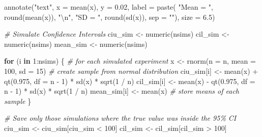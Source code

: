 \documentclass[
  oneside]{krantz}
\makeatletter
\newenvironment{Shaded}{\begin{snugshade}}{\end{snugshade}}
\newcommand{\AttributeTok}[1]{\textcolor[rgb]{0.61,0.61,0.61}{#1}}
\newcommand{\CommentTok}[1]{\textcolor[rgb]{0.37,0.37,0.37}{\textit{#1}}}
\newcommand{\ControlFlowTok}[1]{\textcolor[rgb]{0.27,0.27,0.27}{\textbf{#1}}}
\newcommand{\DecValTok}[1]{\textcolor[rgb]{0.06,0.06,0.06}{#1}}
\newcommand{\FloatTok}[1]{\textcolor[rgb]{0.06,0.06,0.06}{#1}}
\newcommand{\FunctionTok}[1]{\textcolor[rgb]{0,0,0}{#1}}
\newcommand{\NormalTok}[1]{#1}
\newcommand{\OtherTok}[1]{\textcolor[rgb]{0.37,0.37,0.37}{#1}}
\newcommand{\SpecialCharTok}[1]{\textcolor[rgb]{0,0,0}{#1}}
\newcommand{\StringTok}[1]{\textcolor[rgb]{0.5,0.5,0.5}{#1}}
\newenvironment{kframe}{%
\medskip{}
\setlength{\fboxsep}{.8em}
 \def\at@end@of@kframe{}%
 \ifinner\ifhmode%
  \def\at@end@of@kframe{\end{minipage}}%
  \begin{minipage}{\columnwidth}%
 \fi\fi%
 \def\FrameCommand##1{\hskip\@totalleftmargin \hskip-\fboxsep
 \colorbox{shadecolor}{##1}\hskip-\fboxsep
     \hskip-\linewidth \hskip-\@totalleftmargin \hskip\columnwidth}%
 \MakeFramed {\advance\hsize-\width
   \@totalleftmargin\z@ \linewidth\hsize
   \@setminipage}}%
 {\par\unskip\endMakeFramed%
 \at@end@of@kframe}
\renewenvironment{Shaded}{\begin{kframe}}{\end{kframe}}
\makeatother
\begin{document}
\begin{Shaded}
\begin{Highlighting}[]
  \FunctionTok{annotate}\NormalTok{(}\StringTok{"text"}\NormalTok{, }\AttributeTok{x =} \FunctionTok{mean}\NormalTok{(x), }\AttributeTok{y =} \FloatTok{0.02}\NormalTok{, }\AttributeTok{label =} \FunctionTok{paste}\NormalTok{(}
    \StringTok{"Mean = "}\NormalTok{, }\FunctionTok{round}\NormalTok{(}\FunctionTok{mean}\NormalTok{(x)), }\StringTok{"}\SpecialCharTok{\textbackslash{}n}\StringTok{"}\NormalTok{,}
    \StringTok{"SD = "}\NormalTok{, }\FunctionTok{round}\NormalTok{(}\FunctionTok{sd}\NormalTok{(x)), }\AttributeTok{sep =} \StringTok{""}\NormalTok{), }\AttributeTok{size =} \FloatTok{6.5}\NormalTok{)}

\CommentTok{\# Simulate Confidence Intervals}
\NormalTok{ciu\_sim }\OtherTok{\textless{}{-}} \FunctionTok{numeric}\NormalTok{(nsims)}
\NormalTok{cil\_sim }\OtherTok{\textless{}{-}} \FunctionTok{numeric}\NormalTok{(nsims)}
\NormalTok{mean\_sim }\OtherTok{\textless{}{-}} \FunctionTok{numeric}\NormalTok{(nsims)}

\ControlFlowTok{for}\NormalTok{ (i }\ControlFlowTok{in} \DecValTok{1}\SpecialCharTok{:}\NormalTok{nsims) \{ }\CommentTok{\# for each simulated experiment}
\NormalTok{  x }\OtherTok{\textless{}{-}} \FunctionTok{rnorm}\NormalTok{(}\AttributeTok{n =}\NormalTok{ n, }\AttributeTok{mean =} \DecValTok{100}\NormalTok{, }\AttributeTok{sd =} \DecValTok{15}\NormalTok{) }\CommentTok{\# create sample from normal distribution}
\NormalTok{  ciu\_sim[i] }\OtherTok{\textless{}{-}} \FunctionTok{mean}\NormalTok{(x) }\SpecialCharTok{+} \FunctionTok{qt}\NormalTok{(}\FloatTok{0.975}\NormalTok{, }\AttributeTok{df =}\NormalTok{ n }\SpecialCharTok{{-}} \DecValTok{1}\NormalTok{) }\SpecialCharTok{*} \FunctionTok{sd}\NormalTok{(x) }\SpecialCharTok{*} \FunctionTok{sqrt}\NormalTok{(}\DecValTok{1} \SpecialCharTok{/}\NormalTok{ n)}
\NormalTok{  cil\_sim[i] }\OtherTok{\textless{}{-}} \FunctionTok{mean}\NormalTok{(x) }\SpecialCharTok{{-}} \FunctionTok{qt}\NormalTok{(}\FloatTok{0.975}\NormalTok{, }\AttributeTok{df =}\NormalTok{ n }\SpecialCharTok{{-}} \DecValTok{1}\NormalTok{) }\SpecialCharTok{*} \FunctionTok{sd}\NormalTok{(x) }\SpecialCharTok{*} \FunctionTok{sqrt}\NormalTok{(}\DecValTok{1} \SpecialCharTok{/}\NormalTok{ n)}
\NormalTok{  mean\_sim[i] }\OtherTok{\textless{}{-}} \FunctionTok{mean}\NormalTok{(x) }\CommentTok{\# store means of each sample}
\NormalTok{\}}

\CommentTok{\# Save only those simulations where the true value was inside the 95\% CI}
\NormalTok{ciu\_sim }\OtherTok{\textless{}{-}}\NormalTok{ ciu\_sim[ciu\_sim }\SpecialCharTok{\textless{}} \DecValTok{100}\NormalTok{]}
\NormalTok{cil\_sim }\OtherTok{\textless{}{-}}\NormalTok{ cil\_sim[cil\_sim }\SpecialCharTok{\textgreater{}} \DecValTok{100}\NormalTok{]}


\end{Highlighting}
\end{Shaded}
\end{document}
